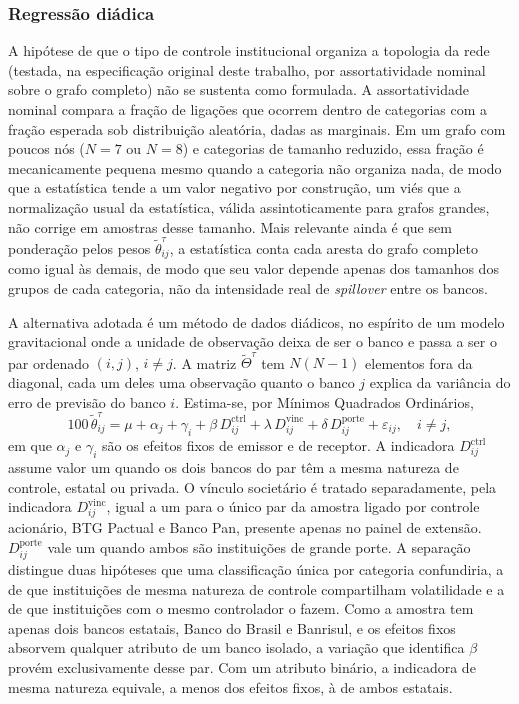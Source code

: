 \documentclass[12pt, a4paper, oneside, english, brazil]{abntex2}
\begin{document}
\subsubsection*{Regressão diádica}
\label{sec:regressao-diadica}

A hipótese de que o tipo de controle institucional organiza a topologia da
rede (testada, na especificação original deste trabalho, por
assortatividade nominal sobre o grafo completo) não se sustenta como
formulada. A assortatividade nominal compara a fração de ligações que
ocorrem dentro de categorias com a fração esperada sob distribuição
aleatória, dadas as marginais. Em um grafo com poucos nós ($N=7$ ou $N=8$) e categorias
de tamanho reduzido, essa fração é mecanicamente pequena mesmo quando a
categoria não organiza nada, de modo que a estatística tende a um valor
negativo por construção, um viés que a normalização usual da estatística,
válida assintoticamente para grafos grandes, não corrige em amostras desse
tamanho. Mais relevante ainda é que sem ponderação pelos pesos $\tilde{\theta}_{ij}^\tau$,
a estatística conta cada aresta do grafo completo como igual às demais, de
modo que seu valor depende apenas dos tamanhos dos grupos de cada categoria,
não da intensidade real de \textit{spillover} entre os bancos.

A alternativa adotada é um método de dados diádicos, no espírito de um
modelo gravitacional onde a unidade de observação deixa de ser o banco e passa a
ser o par ordenado $(i,j)$, $i \neq j$. A matriz $\tilde{\Theta}^\tau$ tem
$N(N-1)$ elementos fora da diagonal, cada um deles uma observação quanto o
banco $j$ explica da variância do erro de previsão do banco $i$. Estima-se,
por Mínimos Quadrados Ordinários,
\begin{equation}
    100\, \tilde{\theta}_{ij}^\tau = \mu + \alpha_j + \gamma_i
    + \beta\, D_{ij}^{\text{ctrl}} + \lambda\, D_{ij}^{\text{vinc}}
    + \delta\, D_{ij}^{\text{porte}} + \varepsilon_{ij},
    \quad i \neq j,
    \label{eq:diadica}
\end{equation}
em que $\alpha_j$ e $\gamma_i$ são os efeitos fixos de emissor e de receptor.
A indicadora $D_{ij}^{\text{ctrl}}$ assume valor um quando os dois bancos do
par têm a mesma natureza de controle, estatal ou privada. O vínculo
societário é tratado separadamente, pela indicadora $D_{ij}^{\text{vinc}}$,
igual a um para o único par da amostra ligado por controle acionário, BTG
Pactual e Banco Pan, presente apenas no painel de extensão. $D_{ij}^{\text{porte}}$
vale um quando ambos são instituições de grande porte. A separação distingue
duas hipóteses que uma classificação única por categoria confundiria, a de que
instituições de mesma natureza de controle compartilham volatilidade e a de que
instituições com o mesmo controlador o fazem. Como a amostra tem apenas dois bancos estatais, 
Banco do Brasil e Banrisul, e os efeitos
fixos absorvem qualquer atributo de um banco isolado, a variação que identifica $\beta$
provém exclusivamente desse par. Com um atributo binário, a indicadora de mesma natureza
equivale, a menos dos efeitos fixos, à de ambos estatais.
\end{document}
